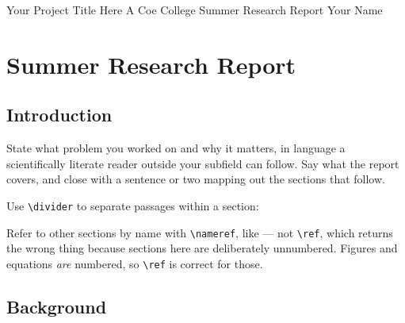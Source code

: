 \documentclass{coereu} %
\begin{document}
\pretitle
{Your Project Title Here}          %
{A Coe College Summer Research Report} %
{Your Name}                        %

\renewcommand{\reportNumber}{1}                        %
\renewcommand{\reportKicker}{Coe College REU}          %
\renewcommand{\coeProgram}{Research at Coe College}    %

\makeatletter
    \startcontents[sections]
    \chapter{Summer Research Report}
\makeatother

\section{Introduction}\label{sec:intro}

State what problem you worked on and why it matters, in language a
scientifically literate reader outside your subfield can follow. Say what
the report covers, and close with a sentence or two mapping out the
sections that follow.

Use \verb|\divider| to separate passages within a section:

\divider

Refer to other sections by name with \verb|\nameref|, like
 --- not \verb|\ref|, which returns the wrong thing
because sections here are deliberately unnumbered. Figures and equations
\emph{are} numbered, so \verb|\ref| is correct for those.

\section{Background}\label{sec:background}
\end{document}
